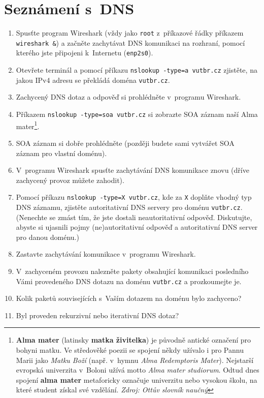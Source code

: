 \section{Seznámení s~DNS}
\begin{enumerate}
    \item Spusťte program Wireshark (vždy jako \texttt{root} z~příkazové řádky příkazem \texttt{wireshark \&}) a začněte zachytávat DNS komunikaci na rozhraní, pomocí kterého jste připojeni k~Internetu (\texttt{enp2s0}).
    \item Otevřete terminál a pomocí příkazu \texttt{nslookup -type=a vutbr.cz} zjistěte, na jakou IPv4 adresu se překládá doména \texttt{vutbr.cz}.
    \item Zachycený DNS dotaz a odpověď si prohlédněte v~programu Wireshark.
    \item Příkazem \texttt{nslookup -type=soa vutbr.cz} si zobrazte SOA záznam naší Alma mater\footnote{\textbf{Alma mater} (latinsky \textbf{matka živitelka}) je původně antické označení pro bohyni matku. Ve středověké poezii se spojení někdy užívalo i pro Pannu Marii jako \emph{Matku Boží} (např. v~hymnu \emph{Alma Redemptoris Mater}). Nejstarší evropská univerzita v~Boloni užívá motto \emph{Alma mater studiorum}. Odtud dnes spojení \textbf{alma mater} metaforicky označuje univerzitu nebo vysokou školu, na které student získal své vzdělání. \emph{Zdroj: Ottův slovník naučný}}.
    \item SOA záznam si dobře prohlédněte (později budete sami vytvářet SOA záznam pro vlastní doménu).
    \item V~programu Wireshark spusťte zachytávání DNS komunikace znovu (dříve zachycený provoz můžete zahodit).
    \item Pomocí příkazu \texttt{nslookup -type=X vutbr.cz}, kde za \texttt{X} doplňte vhodný typ DNS záznamu, zjistěte autoritativní DNS servery pro doménu \texttt{vutbr.cz}. (Nenechte se zmást tím, že jste dostali neautoritativní odpověď. Diskutujte, abyste si ujasnili pojmy (ne)autoritativní odpověď a autoritativní DNS server pro danou doménu.)
    \item Zastavte zachytávání komunikace v~programu Wireshark.
    \item V~zachyceném provozu nalezněte pakety obsahující komunikaci posledního Vámi provedeného DNS dotazu na doménu \texttt{vutbr.cz} a prozkoumejte je.
    \item Kolik paketů souvisejících s~Vaším dotazem na doménu bylo zachyceno?
    \item Byl proveden rekurzivní nebo iterativní DNS dotaz?

\end{enumerate}
